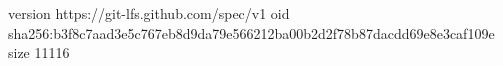 version https://git-lfs.github.com/spec/v1
oid sha256:b3f8c7aad3e5c767eb8d9da79e566212ba00b2d2f78b87dacdd69e8e3caf109e
size 11116

